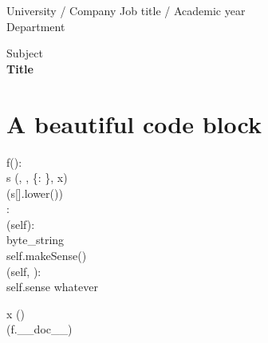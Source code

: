 



\noindent
University / Company \hfill Job title / Academic year \\
Department \\

\begin{center}
	\Large{Subject}\\
	\vspace{0.5cm}
	\Huge\textbf{Title}\\
\end{center}

\vspace{1cm}

\section*{A beautiful code block}

\begin{mdframed}
 f(): \\
\indent s \op{=} (, \op{+}, \{: \}, x)  \\
\indent {}(s[].lower()) \\

 : \\
\indent {} (self): \\
\indent \indent byte\_string \op{=}  \\
\indent \indent self.makeSense(\op{=}) \\
    
\indent {} (self, ): \\
\indent\indent self.sense \op{=} whatever

x \op{=} () \\
(f.\_\_doc\_\_)
\end{mdframed}

